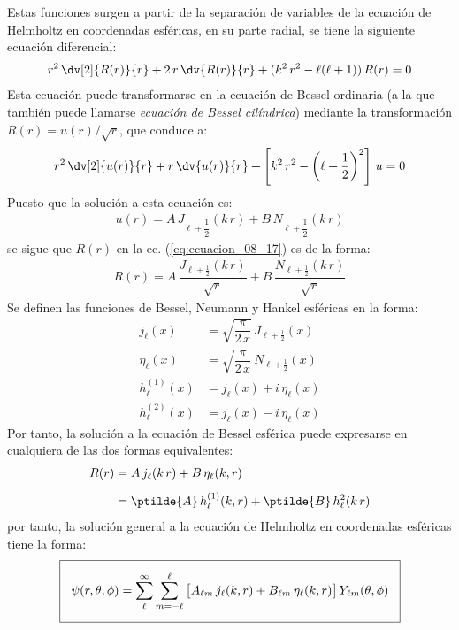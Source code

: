 Estas funciones surgen a partir de la separación de variables de la ecuación de Helmholtz en coordenadas esféricas, en su parte radial, se tiene la siguiente ecuación diferencial:
\begin{align}
r^{2} \, \dv[2]{R(r)}{r} + 2 \, r \, \dv{R(r)}{r} + (k^{2} \, r^{2} - \ell (\ell + 1)) \, R(r) = 0
\label{eq:ecuacion_08_17}
\end{align}
Esta ecuación puede transformarse en la ecuación de Bessel ordinaria (a la que también puede llamarse \emph{ecuación de Bessel cilíndrica}) mediante la transformación $R(r) = u(r) /\sqrt{r}$, que conduce a:
\begin{align*}
r^{2} \, \dv[2]{u(r)}{r} + r \, \dv{u(r)}{r} + \left[ k^{2} \, r^{2} -  \left( \ell + \dfrac{1}{2} \right)^{2} \right] \, u = 0
\end{align*}
Puesto que la solución a esta ecuación es:
\begin{align*}
u(r) = A \, J_{\ell+\dfrac{1}{2}} (k \, r) + B \, N_{\ell+\dfrac{1}{2}} (k \, r)
\end{align*}
se sigue que $R(r)$ en la ec. (\ref{eq:ecuacion_08_17}) es de la forma:
\begin{align*}
R(r) = A \, \dfrac{J_{\ell+\frac{1}{2}} (k \, r)}{\sqrt{r}} + B \, \dfrac{N_{\ell+\frac{1}{2}} (k \, r)}{\sqrt{r}}  \end{align*}
Se definen las funciones de Bessel, Neumann y Hankel esféricas en la forma:
\begin{align*}
j_{\ell} (x) &= \sqrt{\dfrac{\pi}{2 \, x}} \, J_{\ell+\frac{1}{2}} (x) \\[0.5em]
\eta_{\ell} (x) &= \sqrt{\dfrac{\pi}{2 \, x}} \, N_{\ell+\frac{1}{2}} (x) \\[0.5em]
h_{\ell}^{(1)} (x) &= j_{\ell} (x) + i \, \eta_{\ell} (x) \\[0.5em]
h_{\ell}^{(2)} (x) &= j_{\ell} (x) - i \, \eta_{\ell} (x)
\end{align*}
Por tanto, la solución a la ecuación de Bessel esférica puede expresarse en cualquiera de las dos formas equivalentes:
\begin{align}
\begin{aligned}
R(r) &= A \, j_{\ell} (k \, r) +  B \, \eta_{\ell} (k , r) \\[0.5em]
&= \ptilde{A} \, h_{\ell}^{(1)} (k , r) + \ptilde{B} \, h_{\ell}^{2} (k \, r)
\end{aligned}
\label{eq:ecuacion_08_18}
\end{align}
por tanto, la solución general a la ecuación de Helmholtz en coordenadas esféricas tiene la forma:
\begin{align*}
\setlength{\fboxsep}{3\fboxsep}\boxed{
\psi (r, \theta, \phi) = \sum_{\ell}^{\infty} \sum_{m=-\ell}^{\ell} \big[ A_{\ell m} \, j_{\ell} (k , r) + B_{\ell m} \, \eta_{\ell} (k , r) \big] \, Y_{\ell m} (\theta, \phi)}
\end{align*}

